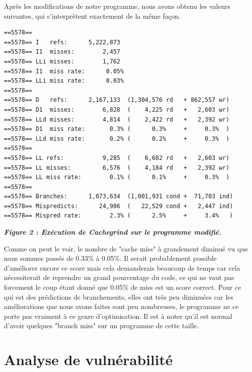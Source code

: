 \documentclass{report}
\begin{document}
Après les modifications de notre programme, nous avons obtenu les valeurs suivantes, qui s’interprètent exactement de la même façon.
\begin{scriptsize}
\begin{lstlisting}
==5578== 
==5578== I   refs:      5,222,873
==5578== I1  misses:        2,457
==5578== LLi misses:        1,762
==5578== I1  miss rate:      0.05%
==5578== LLi miss rate:      0.03%
==5578== 
==5578== D   refs:      2,167,133  (1,304,576 rd   + 862,557 wr)
==5578== D1  misses:        6,828  (    4,225 rd   +   2,603 wr)
==5578== LLd misses:        4,814  (    2,422 rd   +   2,392 wr)
==5578== D1  miss rate:       0.3% (      0.3%     +     0.3%  )
==5578== LLd miss rate:       0.2% (      0.2%     +     0.3%  )
==5578== 
==5578== LL refs:           9,285  (    6,682 rd   +   2,603 wr)
==5578== LL misses:         6,576  (    4,184 rd   +   2,392 wr)
==5578== LL miss rate:        0.1% (      0.1%     +     0.3%  )
==5578== 
==5578== Branches:      1,073,634  (1,001,931 cond +  71,703 ind)
==5578== Mispredicts:      24,986  (   22,529 cond +   2,447 ind)
==5578== Mispred rate:        2.3% (      2.5%     +     3.4%   )
\end{lstlisting}
\end{scriptsize}

\begin{center}
\textbf{\textit{Figure 2 : Exécution de Cachegrind sur le programme modifié.}}
\end{center}

Comme on peut le voir, le nombre de "cache miss" à grandement diminué vu que nous sommes passés de 0.33\% à 0.05\%. 
\newline
Il serait probablement possible d'améliorer encore ce score mais cela demanderais beaucoup de temps car cela nécessiterait de reprendre un grand pourcentage du code, ce qui ne vaut pas forcement le coup étant donné que 0.05\% de miss est un score correct.
\newline
Pour ce qui est des prédictions de branchements, elles ont très peu diminuées car les améliorations que nous avons faites sont peu nombreuses, le programme ne ce porte pas vraiment à ce genre d'optimisation.
\newline
Il est à noter qu'il est normal d'avoir quelques "branch miss" sur un programme de cette taille.

\chapter{Analyse de vulnérabilité }
\end{document}
